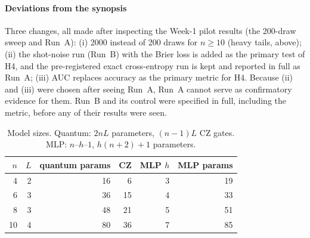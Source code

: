 \documentclass[conference]{IEEEtran}
\begin{document}
\paragraph*{Deviations from the synopsis} Three changes, all made after
inspecting the Week-1 pilot results (the 200-draw sweep and Run~A):
(i) 2000 instead of 200 draws for $n\ge10$ (heavy tails, above);
(ii) the shot-noise run (Run~B) with the Brier loss is added as the primary
test of H4, and the pre-registered exact cross-entropy run is kept and
reported in full as Run~A; (iii) AUC replaces accuracy as the primary metric
for H4. Because (ii) and (iii) were chosen after seeing Run~A, Run~A cannot
serve as confirmatory evidence for them. Run~B and its control were specified
in full, including the metric, before any of their results were seen.

\begin{table}[t]
\centering
\caption{Model sizes. Quantum: $2nL$ parameters, $(n-1)L$ CZ gates.
MLP: $n$--$h$--$1$, $h(n+2)+1$ parameters.}
\label{tab:params}
\begin{tabular}{@{}rrrrrr@{}}
\toprule
$n$ & $L$ & quantum params & CZ & MLP $h$ & MLP params\\
\midrule
4 & 2 & 16 & 6 & 3 & 19\\
6 & 3 & 36 & 15 & 4 & 33\\
8 & 3 & 48 & 21 & 5 & 51\\
10 & 4 & 80 & 36 & 7 & 85\\
\bottomrule
\end{tabular}
\end{table}
\end{document}
